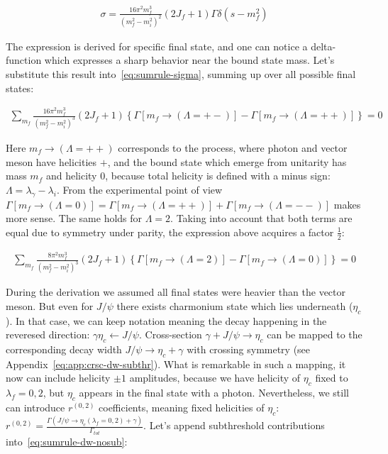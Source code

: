 \begin{align} \label{eq:crsc-dw}
    \sigma = \frac{16 \pi^2 m_f^3}{(m_f^2 - m_i^2)^2} (2J_f + 1) \Gamma \delta(s - m_f^2)
\end{align}

The expression is derived for specific final state, and one can notice a delta-function which expresses a sharp behavior near the bound state mass. Let's substitute this result into~\cref{eq:sumrule-sigma}, summing up over all possible final states:

\begin{align}
    \sum_{m_f} \frac{16 \pi^2 m_f^3}{(m_f^2 - m_i^2)^3} (2J_f+1) \left\{ \Gamma\left[m_f \rightarrow (\Lambda = +-)\right] - \Gamma\left[m_f \rightarrow (\Lambda = ++)\right] \right\} = 0
\end{align}

Here $m_f \rightarrow (\Lambda = ++)$ corresponds to the process, where photon and vector meson have helicities $+$, and the bound state which emerge from unitarity has mass $m_f$ and helicity $0$, because total helicity is defined with a minus sign: $\Lambda = \lambda_\gamma - \lambda_i$. From the experimental point of view $\Gamma\left[m_f \rightarrow (\Lambda=0)\right] = \Gamma\left[m_f \rightarrow (\Lambda = ++)\right] + \Gamma\left[m_f \rightarrow (\Lambda = --)\right]$ makes more sense. The same holds for $\Lambda=2$. Taking into account that both terms are equal due to symmetry under parity, the expression above acquires a factor $\frac{1}{2}$:


\begin{align} \label{eq:sumrule-dw-nosub}
    \sum_{m_f} \frac{8 \pi^2 m_f^3}{(m_f^2 - m_i^2)^3} (2J_f+1) \left\{\Gamma\left[m_f \rightarrow (\Lambda = 2)\right] - \Gamma\left[m_f \rightarrow (\Lambda = 0)\right] \right\} = 0
\end{align}

During the derivation we assumed all final states were heavier than the vector meson. But even for $J/\psi$ there exists charmonium state which lies underneath ($\eta_c$). In that case, we can keep notation meaning the decay happening in the reveresed direction: $\gamma \eta_c \leftarrow J/\psi$. Cross-section $\gamma + J/\psi \rightarrow \eta_c$ can be mapped to the corresponding decay width $J/\psi \rightarrow \eta_c + \gamma$ with crossing symmetry (see Appendix~\cref{eq:app:crsc-dw-subthr}). What is remarkable in such a mapping, it now can include helicity $\pm1$ amplitudes, because we have helicity of $\eta_c$ fixed to $\lambda_f = 0, 2$, but $\eta_c$ appears in the final state with a photon. Nevertheless, we still can introduce $r^{(0,2)}$ coefficients, meaning fixed helicities of $\eta_c$: $r^{(0,2)} = \frac{\Gamma(J/\psi \rightarrow \eta_c(\lambda_f = 0, 2) + \gamma)}{\Gamma_{tot}}$. Let's append subthreshold contributions into~\cref{eq:sumrule-dw-nosub}:

